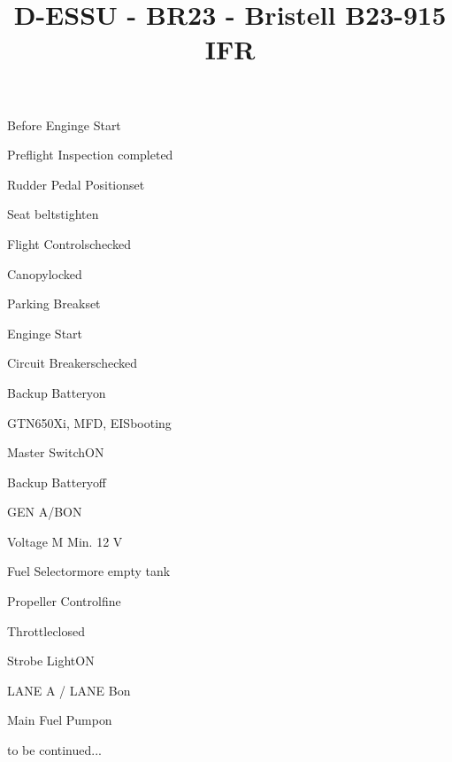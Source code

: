 \def\papersize{5}




\title{D-ESSU  -  BR23  -  Bristell B23-915 IFR}

\begin{checklist}{Before Enginge Start}
  \item{Preflight Inspection  }{completed}
  \item{Rudder Pedal Position}{set}
  \item{Seat belts}{tighten}
  \item{Flight Controls}{checked}
  \item{Canopy}{locked}
  \item{Parking Break}{set}
\end{checklist}

\begin{checklist}{Enginge Start}
  \item{Circuit Breakers}{checked}
  \item{Backup Battery}{on}
  \item{GTN650Xi, MFD, EIS}{booting}

  \item{Master Switch}{ON}


  \item{Backup Battery}{off}
  \item{GEN A/B}{ON}
  \item{Voltage M }{Min. 12 V}
  \item{Fuel Selector}{more empty tank}
  \item{Propeller Control}{fine}
  \item{Throttle}{closed}
  \item{Strobe Light}{ON}
  \item{LANE A / LANE B}{on}
  \item{Main Fuel Pump}{on} 

to be continued...
\end{checklist}

